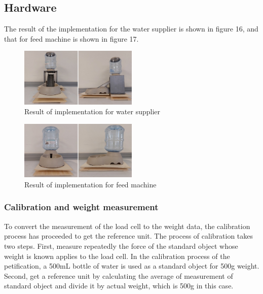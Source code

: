 \documentclass[conference]{IEEEtran}
\begin{document}
\subsection{Hardware}
The result of the implementation for the water supplier is shown in figure 16, and that for feed machine is shown in figure 17.

\begin{figure}[htbp]
\centerline{\includegraphics[width=0.5\textwidth]{./images/Water Supplier.jpg}}
\caption{Result of implementation for water supplier}
\label{fig}
\end{figure}

\begin{figure}[htbp]
\centerline{\includegraphics[width=0.5\textwidth]{./images/Feed Machine.jpg}}
\caption{Result of implementation for feed machine}
\label{fig}
\end{figure}

\subsubsection{Calibration and weight measurement}
To convert the measurement of the load cell to the weight data, the calibration process has proceeded to get the reference unit. The process of calibration takes two steps. First, measure repeatedly the force of the standard object whose weight is known applies to the load cell. In the calibration process of the petification, a 500mL bottle of water is used as a standard object for 500g weight. Second, get a reference unit by calculating the average of measurement of standard object and divide it by actual weight, which is 500g in this case.
\end{document}

